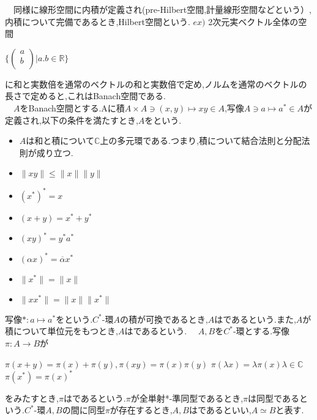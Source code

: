 　同様に線形空間に内積が定義され(pre-Hilbert空間,計量線形空間などという）,内積について完備であるとき,Hilbert空間という.
 $ex)$ 2次元実ベクトル全体の空間
\begin{center}
$\Biggl\{ \left(
\begin{array}{c}
a \\
b \\
\end{array}
\right)\Biggl|a.b\in \mathbb{R}\Biggr\}$
\end{center}
に和と実数倍を通常のベクトルの和と実数倍で定め,ノルムを通常のベクトルの長さで定めると,これはBanach空間である.\\
　$A$をBanach空間とする.Aに積$A \times A \ni \left(x,y\right) \mapsto xy \in A$,写像$A\ni a \mapsto a^*\in A$が定義され,以下の条件を満たすとき,$A$をという.
\begin{itemize}
\item $A$は和と積について$\mathbb C$上の多元環である.つまり,積について結合法則と分配法則が成り立つ.
\item $\parallel xy\parallel \leq \parallel x\parallel \parallel y\parallel$
\item $\left(x^*\right)^*=x$
\item $\left(x+y\right)=x^*+y^*$
\item $\left(xy\right)^*=y^*a^*$
\item $\left(\alpha x\right)^*=\overline{\alpha} x^*$
\item $\parallel x^*\parallel=\parallel x\parallel$
\item $\parallel xx^*\parallel=\parallel x\parallel \parallel x^*\parallel$
\end{itemize}
写像$*:a \mapsto a^*$をという.$C^*$-環$A$の積が可換であるとき,$A$はであるという.また,$A$が積について単位元をもつとき,$A$はであるという.
　$A,B$を$C^*$-環とする.写像$\pi:A \rightarrow B$が
\begin{center}
$\pi \left( x+y\right)=\pi \left( x\right)+\pi \left( y\right),　\pi \left( xy\right)=\pi \left( x\right)\pi \left( y\right)$
$\pi \left( \lambda x\right)=\lambda \pi \left( x\right)　\lambda \in \mathbb{C}$
$\pi \left(x^*\right)=\pi \left(x\right)^*$
\end{center}
をみたすとき,$\pi$はであるという.$\pi $が全単射*-準同型であるとき,$\pi$は同型であるという.$C^*$-環$A,B$の間に同型$\pi$が存在するとき,$A,B$はであるといい,$A\simeq B$と表す.
